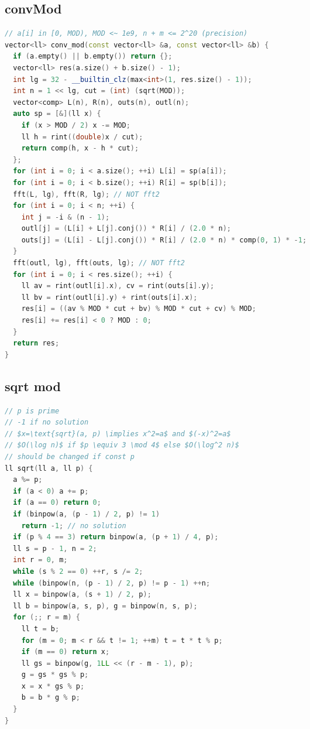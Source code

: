 \documentclass[8pt,a4paper,landscape,twosided]{extarticle}
\begin{document}
\begin{multicols*}{3}
\subsection{convMod}
\begin{lstlisting}[language=C++]
// a[i] in [0, MOD), MOD <~ 1e9, n + m <= 2^20 (precision)
vector<ll> conv_mod(const vector<ll> &a, const vector<ll> &b) {
  if (a.empty() || b.empty()) return {};
  vector<ll> res(a.size() + b.size() - 1);
  int lg = 32 - __builtin_clz(max<int>(1, res.size() - 1));
  int n = 1 << lg, cut = (int) (sqrt(MOD));
  vector<comp> L(n), R(n), outs(n), outl(n);
  auto sp = [&](ll x) {
    if (x > MOD / 2) x -= MOD;
    ll h = rint((double)x / cut);
    return comp(h, x - h * cut);
  };
  for (int i = 0; i < a.size(); ++i) L[i] = sp(a[i]);
  for (int i = 0; i < b.size(); ++i) R[i] = sp(b[i]);
  fft(L, lg), fft(R, lg); // NOT fft2
  for (int i = 0; i < n; ++i) {
    int j = -i & (n - 1);
    outl[j] = (L[i] + L[j].conj()) * R[i] / (2.0 * n);
    outs[j] = (L[i] - L[j].conj()) * R[i] / (2.0 * n) * comp(0, 1) * -1;
  }
  fft(outl, lg), fft(outs, lg); // NOT fft2
  for (int i = 0; i < res.size(); ++i) {
    ll av = rint(outl[i].x), cv = rint(outs[i].y);
    ll bv = rint(outl[i].y) + rint(outs[i].x);
    res[i] = ((av % MOD * cut + bv) % MOD * cut + cv) % MOD;
    res[i] += res[i] < 0 ? MOD : 0;
  }
  return res;
}
\end{lstlisting}

\subsection{sqrt mod}
\begin{lstlisting}[language=C++]
// p is prime
// -1 if no solution
// $x=\text{sqrt}(a, p) \implies x^2=a$ and $(-x)^2=a$
// $O(\log n)$ if $p \equiv 3 \mod 4$ else $O(\log^2 n)$
// should be changed if const p
ll sqrt(ll a, ll p) {
  a %= p;
  if (a < 0) a += p;
  if (a == 0) return 0;
  if (binpow(a, (p - 1) / 2, p) != 1)
    return -1; // no solution
  if (p % 4 == 3) return binpow(a, (p + 1) / 4, p);
  ll s = p - 1, n = 2;
  int r = 0, m;
  while (s % 2 == 0) ++r, s /= 2;
  while (binpow(n, (p - 1) / 2, p) != p - 1) ++n;
  ll x = binpow(a, (s + 1) / 2, p);
  ll b = binpow(a, s, p), g = binpow(n, s, p);
  for (;; r = m) {
    ll t = b;
    for (m = 0; m < r && t != 1; ++m) t = t * t % p;
    if (m == 0) return x;
    ll gs = binpow(g, 1LL << (r - m - 1), p);
    g = gs * gs % p;
    x = x * gs % p;
    b = b * g % p;
  }
}
\end{lstlisting}


\end{multicols*}
\end{document}
